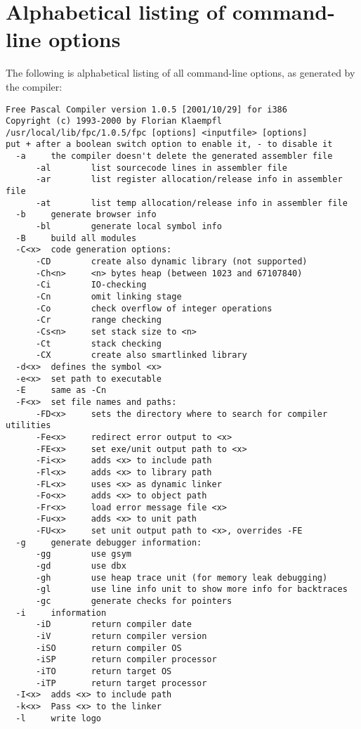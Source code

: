 \chapter{Alphabetical listing of command-line options}
The following is alphabetical listing of all command-line options, as
generated by the compiler:
\begin{verbatim}
Free Pascal Compiler version 1.0.5 [2001/10/29] for i386
Copyright (c) 1993-2000 by Florian Klaempfl
/usr/local/lib/fpc/1.0.5/fpc [options] <inputfile> [options]
put + after a boolean switch option to enable it, - to disable it
  -a     the compiler doesn't delete the generated assembler file
      -al        list sourcecode lines in assembler file
      -ar        list register allocation/release info in assembler file
      -at        list temp allocation/release info in assembler file
  -b     generate browser info
      -bl        generate local symbol info
  -B     build all modules
  -C<x>  code generation options:
      -CD        create also dynamic library (not supported)
      -Ch<n>     <n> bytes heap (between 1023 and 67107840)
      -Ci        IO-checking
      -Cn        omit linking stage
      -Co        check overflow of integer operations
      -Cr        range checking
      -Cs<n>     set stack size to <n>
      -Ct        stack checking
      -CX        create also smartlinked library
  -d<x>  defines the symbol <x>
  -e<x>  set path to executable
  -E     same as -Cn
  -F<x>  set file names and paths:
      -FD<x>     sets the directory where to search for compiler utilities
      -Fe<x>     redirect error output to <x>
      -FE<x>     set exe/unit output path to <x>
      -Fi<x>     adds <x> to include path
      -Fl<x>     adds <x> to library path
      -FL<x>     uses <x> as dynamic linker
      -Fo<x>     adds <x> to object path
      -Fr<x>     load error message file <x>
      -Fu<x>     adds <x> to unit path
      -FU<x>     set unit output path to <x>, overrides -FE
  -g     generate debugger information:
      -gg        use gsym
      -gd        use dbx
      -gh        use heap trace unit (for memory leak debugging)
      -gl        use line info unit to show more info for backtraces
      -gc        generate checks for pointers
  -i     information
      -iD        return compiler date
      -iV        return compiler version
      -iSO       return compiler OS
      -iSP       return compiler processor
      -iTO       return target OS
      -iTP       return target processor
  -I<x>  adds <x> to include path
  -k<x>  Pass <x> to the linker
  -l     write logo

\end{verbatim}
